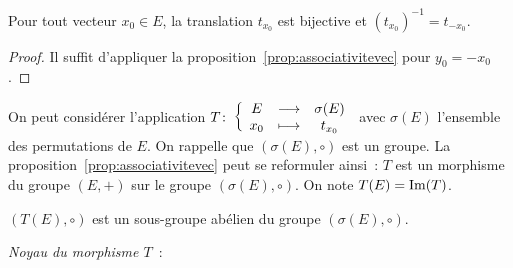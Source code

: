 \begin{prop}
  Pour tout vecteur \(x_0 \in E\), la translation \(t_{x_0}\) est bijective et \((t_{x_0})^{-1}=t_{-x_0}\).
\end{prop}
\begin{proof}
  Il suffit d'appliquer la proposition~\ref{prop:associativitevec} pour \(y_0=-x_0\).
\end{proof}

On peut considérer l'application \(T\colon \left\{\begin{array}{ccc} E & \longrightarrow &\sigma(E)\\ x_0 & \longmapsto & t_{x_0} \end{array} \right.\) avec \(\sigma(E)\) l'ensemble des permutations de \(E\). On rappelle que \((\sigma(E),\circ)\) est un groupe. La proposition~\ref{prop:associativitevec} peut se reformuler ainsi~: \(T\) est un morphisme du groupe \((E,+)\) sur le groupe \((\sigma(E),\circ)\). On note \(T(E)=\operatorname{Im}(T)\).

\begin{prop}
  \((T(E),\circ)\) est un sous-groupe abélien du groupe \((\sigma(E),\circ)\).
\end{prop}

\emph{Noyau du morphisme \(T\)}~:


